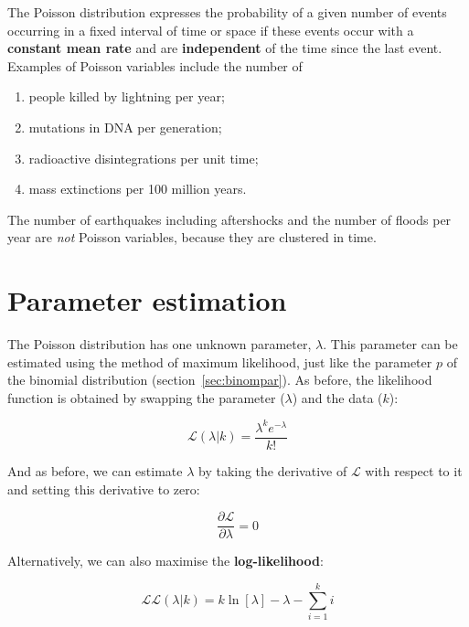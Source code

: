 The Poisson distribution expresses the probability of a given number
of events occurring in a fixed interval of time or space if these
events occur with a \textbf{constant mean rate} and are
\textbf{independent} of the time since the last event. Examples of
Poisson variables include the number of

\begin{enumerate}
\item people killed by lightning per year;
\item mutations in DNA per generation;
\item radioactive disintegrations per unit time;
\item mass extinctions per 100 million years.
\end{enumerate}

The number of earthquakes including aftershocks and the number of
floods per year are \emph{not} Poisson variables, because they are
clustered in time.

\section{Parameter estimation}
\label{sec:poispar}

The Poisson distribution has one unknown parameter, $\lambda$. This
parameter can be estimated using the method of maximum likelihood,
just like the parameter $p$ of the binomial distribution
(section~\ref{sec:binompar}). As before, the likelihood function is
obtained by swapping the parameter ($\lambda$) and the data ($k$):

\begin{equation}
  \mathcal{L}(\lambda|k) = \frac{\lambda^k e^{-\lambda}}{k!}
  \label{eq:poislik}
\end{equation}

And as before, we can estimate $\lambda$ by taking the derivative of
$\mathcal{L}$ with respect to it and setting this derivative to zero:

\begin{equation}
  \frac{\partial{\mathcal{L}}}{\partial{\lambda}} = 0
\end{equation}

Alternatively, we can also maximise the \textbf{log-likelihood}:

\begin{equation}
  \mathcal{LL}(\lambda|k) = k \ln[\lambda] - \lambda - \sum\limits_{i=1}^{k}i
  \label{eq:poisLL}
\end{equation}

